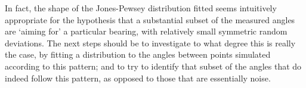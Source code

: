 \documentclass[12pt,fleqn]{article} %
\begin{document}
\begin{figure}[!h]
\begin{subfigure}[t]{0.5\textwidth}
\end{subfigure}
\end{figure}

In fact, the shape of the Jones-Pewsey distribution fitted seems intuitively appropriate for the hypothesis that a substantial subset of the measured angles are `aiming for' a particular bearing, with relatively small symmetric random deviations. The next steps should be to investigate to what degree this is really the case, by fitting a distribution to the angles between points simulated according to this pattern; and to try to identify that subset of the angles that do indeed follow this pattern, as opposed to those that are essentially noise.

\printbibliography
\end{document}
